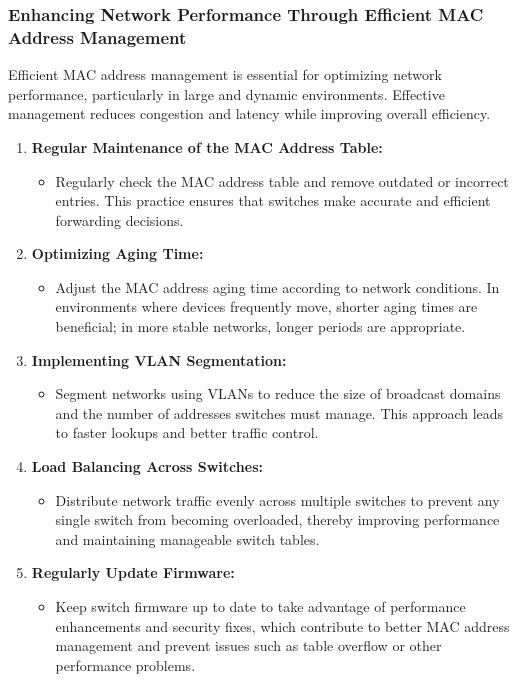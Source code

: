 \documentclass[11pt,a4paper]{article}
\begin{document}
    \subsubsection*{Enhancing Network Performance Through Efficient MAC Address Management}
    Efficient MAC address management is essential for optimizing network performance, particularly in large and dynamic environments. Effective management reduces congestion and latency while improving overall efficiency.
    
    \begin{enumerate}
        \item \textbf{Regular Maintenance of the MAC Address Table:}
            \begin{itemize}
                \item Regularly check the MAC address table and remove outdated or incorrect entries. This practice ensures that switches make accurate and efficient forwarding decisions.
            \end{itemize}
        \item \textbf{Optimizing Aging Time:}
            \begin{itemize}
                \item Adjust the MAC address aging time according to network conditions. In environments where devices frequently move, shorter aging times are beneficial; in more stable networks, longer periods are appropriate.
            \end{itemize}
        \item \textbf{Implementing VLAN Segmentation:}
            \begin{itemize}
                \item Segment networks using VLANs to reduce the size of broadcast domains and the number of addresses switches must manage. This approach leads to faster lookups and better traffic control.
            \end{itemize}
        \item \textbf{Load Balancing Across Switches:}
            \begin{itemize}
                \item Distribute network traffic evenly across multiple switches to prevent any single switch from becoming overloaded, thereby improving performance and maintaining manageable switch tables.
            \end{itemize}
        \item \textbf{Regularly Update Firmware:}
            \begin{itemize}
                \item Keep switch firmware up to date to take advantage of performance enhancements and security fixes, which contribute to better MAC address management and prevent issues such as table overflow or other performance problems.
            \end{itemize}
    \end{enumerate}
\end{document}
